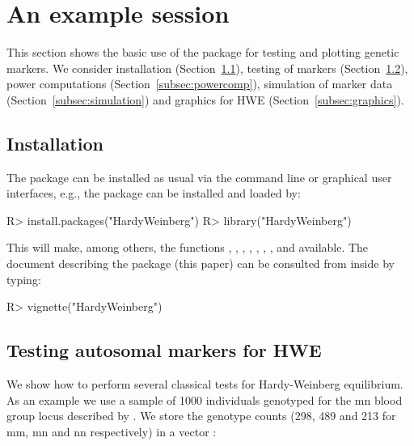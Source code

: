 \documentclass[nojss]{jss}
\begin{document}
\section{An example session}
\label{sec:session}

This section shows the basic use of the package for testing and
plotting genetic markers. We consider installation
(Section~\ref{subsec:install}), testing of markers
(Section~\ref{subsec:testing}), power computations
(Section~\ref{subsec:powercomp}), simulation of marker data
(Section~\ref{subsec:simulation}) and graphics for HWE
(Section~\ref{subsec:graphics}).

\subsection{Installation}
\label{subsec:install}

The  package can be installed as usual via the command line or graphical
user interfaces, e.g., the package can be installed and loaded by:


\begin{Schunk}
\begin{Sinput}
R> install.packages("HardyWeinberg")
R> library("HardyWeinberg")
\end{Sinput}
\end{Schunk}

%
This will make, among others, the functions ,
, , , ,
, , and 
available. The document describing the package (this paper) can be
consulted from inside  by typing:
%

\begin{Schunk}
\begin{Sinput}
R> vignette("HardyWeinberg")
\end{Sinput}
\end{Schunk}


\subsection{Testing autosomal markers for HWE}
\label{subsec:testing}

We show how to perform several classical tests for Hardy-Weinberg
equilibrium. As an example we use a sample of 1000 individuals
genotyped for the {\sc mn} blood group locus described by
\citet[Table~2.4]{Hedrick}. We store the genotype counts (298, 489 and
213 for {\sc mm, mn} and {\sc nn} respectively) in a vector :
%
\end{document}
